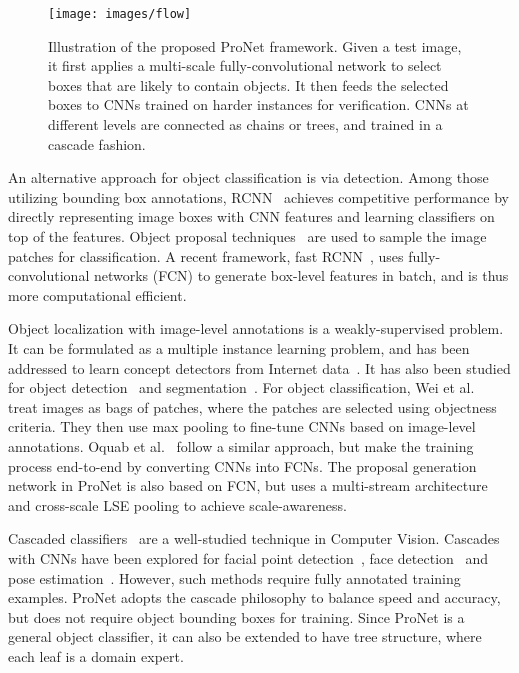 \documentclass[10pt,twocolumn,letterpaper]{article}
\begin{document}
\begin{figure*}[!ht]
  \centering
    \texttt{[image: images/flow]}
  \caption{Illustration of the proposed ProNet framework. Given a test image, it first applies a multi-scale fully-convolutional network to select boxes that are likely to contain objects. It then feeds the selected boxes to CNNs trained on harder instances for verification. CNNs at different levels are connected as chains or trees, and trained in a cascade fashion.}
  \label{fig:flow}
\end{figure*}

An alternative approach for object classification is via detection. Among those utilizing bounding box annotations, RCNN~\cite{DBLP:journals/corr/GirshickDDM13} achieves competitive performance by directly representing image boxes with CNN features and learning classifiers on top of the features. Object proposal techniques~\cite{DBLP:journals/ijcv/UijlingsSGS13,DBLP:conf/eccv/ZitnickD14} are used to sample the image patches for classification. A recent framework, fast RCNN~\cite{DBLP:journals/corr/Girshick15}, uses fully-convolutional networks (FCN) to generate box-level features in batch, and is thus more computational efficient.

Object localization with image-level annotations is a weakly-supervised problem. It can be formulated as a multiple instance learning problem, and has been addressed to learn concept detectors from Internet data~\cite{chen2013neil,DBLP:conf/cvpr/DivvalaFG14,wu2015webconcept}. It has also been studied for object detection~\cite{Bilen_2015_CVPR,DBLP:conf/cvpr/CinbisVS14,DBLP:conf/icml/SongGJMHD14,DBLP:conf/eccv/RussakovskyLYF12,zhou2015cnnlocalization} and segmentation~\cite{DBLP:journals/corr/DaiH015,DBLP:journals/corr/PapandreouCMY15,pinheiro:2015a}. For object classification, Wei et al.~\cite{DBLP:journals/corr/WeiXHNDZY14} treat images as bags of patches, where the patches are selected using objectness criteria. They then use max pooling to fine-tune CNNs based on image-level annotations. Oquab et al.~\cite{Oquab_2015_CVPR} follow a similar approach, but make the training process end-to-end by converting CNNs into FCNs. The proposal generation network in ProNet is also based on FCN, but uses a multi-stream architecture and cross-scale LSE pooling to achieve scale-awareness.

Cascaded classifiers~\cite{DBLP:conf/cvpr/ViolaJ01} are a well-studied technique in Computer Vision. Cascades with CNNs have been explored for facial point detection~\cite{DBLP:conf/cvpr/SunWT13}, face detection~\cite{DBLP:conf/cvpr/LiLSBH15} and pose estimation~\cite{DBLP:journals/corr/ToshevS13}. However, such methods require fully annotated training examples. ProNet adopts the cascade philosophy to balance speed and accuracy, but does not require object bounding boxes for training. Since ProNet is a general object classifier, it can also be extended to have tree structure, where each leaf is a domain expert.
\end{document}
